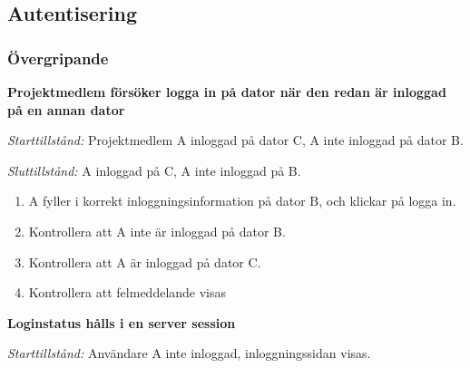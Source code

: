 \documentclass[a4paper]{article}
\begin{document}


\subsection{Autentisering}

\subsubsection{Övergripande}

\begin{FT}
\item
\textbf{Projektmedlem försöker logga in på dator när den redan är inloggad på en annan dator}

\emph{Starttillstånd:} Projektmedlem A inloggad på dator C, A inte inloggad på dator B.

\emph{Sluttillstånd:} A inloggad på C, A inte inloggad på B.

\begin{enumerate}
\item A fyller i korrekt inloggningsinformation på dator B, och klickar på logga in.
\item Kontrollera att A inte är inloggad på dator B.
\item Kontrollera att A är inloggad på dator C.
\item Kontrollera att felmeddelande visas
\end{enumerate}


%
%
%

\item
\textbf{Loginstatus hålls i en server session}

\emph{Starttillstånd:} Användare A inte inloggad, inloggningssidan visas.


\end{FT}
\end{document}

